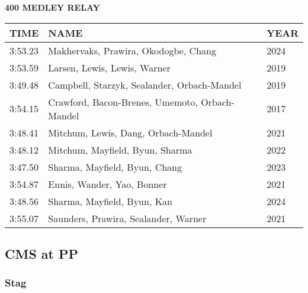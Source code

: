 \vspace{0.4cm}

\begin{center}
\begin{minipage}[t]{0.7\textwidth}
\centering
\textbf{400 MEDLEY RELAY}\\[0.05cm]
\begin{tabular}{@{}p{1.8cm}p{2.8cm}p{1.2cm}@{}}
\hline
\textbf{TIME} & \textbf{NAME} & \textbf{YEAR} \\
\hline
3:53.23 & Makhervaks, Prawira, Okodogbe, Chang & 2024 \\
3:53.59 & Larsen, Lewis, Lewis, Warner & 2019 \\
3:49.48 & Campbell, Starzyk, Sealander, Orbach-Mandel & 2019 \\
3:54.15 & Crawford, Bacon-Brenes, Umemoto, Orbach-Mandel & 2017 \\
3:48.41 & Mitchum, Lewis, Dang, Orbach-Mandel & 2021 \\
3:48.12 & Mitchum, Mayfield, Byun, Sharma & 2022 \\
3:47.50 & Sharma, Mayfield, Byun, Chang & 2023 \\
3:54.87 & Ennis, Wander, Yao, Bonner & 2021 \\
3:48.56 & Sharma, Mayfield, Byun, Kan & 2024 \\
3:55.07 & Saunders, Prawira, Sealander, Warner & 2021 \\
\hline
\end{tabular}
\end{minipage}
\end{center}

\vspace{0.4cm}

\newpage

\subsection{CMS at PP}
\subsubsection{Stag}

